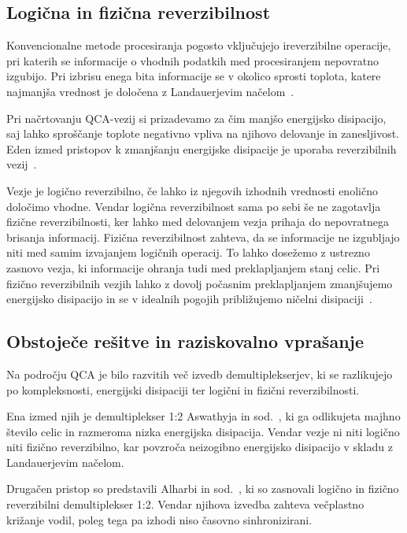 \documentclass[graybox, envcountchap]{svmult}
\begin{document}
\subsection{Logična in fizična reverzibilnost}
\label{g21:sec:reverzibilnost}

Konvencionalne metode procesiranja pogosto vključujejo ireverzibilne operacije, pri katerih se informacije o vhodnih podatkih med procesiranjem nepovratno izgubijo. Pri izbrisu enega bita informacije se v okolico sprosti toplota, katere najmanjša vrednost je določena z Landauerjevim načelom~\cite{alharbi2023alu}.

Pri načrtovanju QCA-vezij si prizadevamo za čim manjšo energijsko disipacijo, saj lahko sproščanje toplote negativno vpliva na njihovo delovanje in zanesljivost. Eden izmed pristopov k zmanjšanju energijske disipacije je uporaba reverzibilnih vezij~\cite{alharbi2023alu}. 

Vezje je logično reverzibilno, če lahko iz njegovih izhodnih vrednosti enolično določimo vhodne. Vendar logična reverzibilnost sama po sebi še ne zagotavlja fizične reverzibilnosti, ker lahko med delovanjem vezja prihaja do nepovratnega brisanja informacij. Fizična reverzibilnost zahteva, da se informacije ne izgubljajo niti med samim izvajanjem logičnih operacij. To lahko dosežemo z ustrezno zasnovo vezja, ki informacije ohranja tudi med preklapljanjem stanj celic. Pri fizično reverzibilnih vezjih lahko z dovolj počasnim preklapljanjem zmanjšujemo energijsko disipacijo in se v idealnih pogojih približujemo ničelni disipaciji~\cite{alharbi2023alu}.

\subsection{Obstoječe rešitve in raziskovalno vprašanje}
\label{g21:sec:resitve}

Na področju QCA je bilo razvitih več izvedb demultiplekserjev, ki se razlikujejo po kompleksnosti, energijski disipaciji ter logični in fizični reverzibilnosti.

Ena izmed njih je demultiplekser 1:2 Aswathyja in sod.~\cite{aswathy2024}, ki ga odlikujeta majhno število celic in razmeroma nizka energijska disipacija. Vendar vezje ni niti logično niti fizično reverzibilno, kar povzroča neizogibno energijsko disipacijo v skladu z Landauerjevim načelom.

Drugačen pristop so predstavili Alharbi in sod.~\cite{alharbi2022}, ki so zasnovali logično in fizično reverzibilni demultiplekser 1:2. Vendar njihova izvedba zahteva večplastno križanje vodil, poleg tega pa izhodi niso časovno sinhronizirani.
\end{document}
